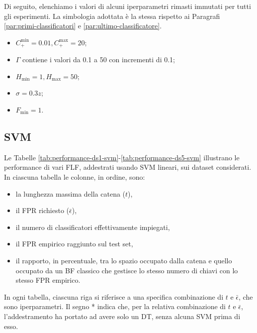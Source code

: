 Di seguito, elenchiamo i valori di alcuni iperparametri rimasti immutati per tutti gli esperimenti. La simbologia adottata è la stessa rispetto ai Paragrafi \ref{par:primi-classificatori} e \ref{par:ultimo-classificatore}.
\begin{itemize}
    \item $C_+^{\text{min}} = 0.01, C_+^{\text{max}}=20$;

    \item $\Gamma$ contiene i valori da 0.1 a 50 con incrementi di 0.1;

    \item $H_{\text{min}} = 1, H_{\text{max}}=50$;

    \item $\sigma = 0.3z$;

    \item $F_{\text{min}} = 1$.
\end{itemize}











\subsection{SVM}
\label{par:svm-results}

Le Tabelle \ref{tab:performance-ds1-svm}-\ref{tab:performance-ds5-svm} illustrano le performance di vari FLF, addestrati usando SVM lineari, sui dataset considerati. In ciascuna tabella le colonne, in ordine, sono:
\begin{itemize}
    \item la lunghezza massima della catena ($t$),
    \item il FPR richiesto ($\bar \epsilon$),
    \item il numero di classificatori effettivamente impiegati,
    \item il FPR empirico raggiunto sul test set,
    \item il rapporto, in percentuale, tra lo spazio occupato dalla catena e quello occupato da un BF classico che gestisce lo stesso numero di chiavi con lo stesso FPR empirico.
\end{itemize}
In ogni tabella, ciascuna riga si riferisce a una specifica combinazione di $t$ e $\bar \epsilon$, che sono iperparametri. Il segno * indica che, per la relativa combinazione di $t$ e $\bar \epsilon$, l'addestramento ha portato ad avere solo un DT, senza alcuna SVM prima di esso.

